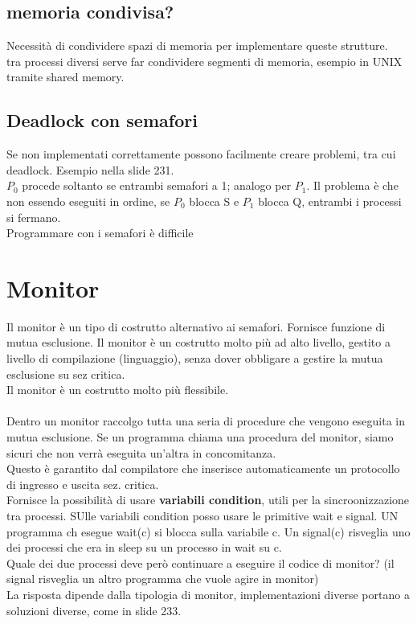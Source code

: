 \documentclass{article}
\begin{document}
\subsection{memoria condivisa?}
Necessità di condividere spazi di memoria per implementare queste strutture. \\
tra processi diversi serve far condividere segmenti di memoria, esempio in UNIX tramite shared memory.

\subsection{Deadlock con semafori}
Se non implementati correttamente possono facilmente creare problemi, tra cui deadlock. Esempio nella slide 231.\\
$P_0$ procede soltanto se entrambi semafori a 1; analogo per $P_1$. Il problema è che non essendo eseguiti in ordine, se $P_0$ blocca S e $P_1$ blocca Q, entrambi i processi si fermano.\\
Programmare con i semafori è difficile

\section{Monitor}
Il monitor è un tipo di costrutto alternativo ai semafori. Fornisce funzione di mutua esclusione. Il monitor è un costrutto molto più ad alto livello, gestito a livello di compilazione (linguaggio), senza dover obbligare a gestire la mutua esclusione su sez critica.\\
Il monitor è un costrutto molto più flessibile.\\
\\
Dentro un monitor raccolgo tutta una seria di procedure che vengono eseguita in mutua esclusione. Se un programma chiama una procedura del monitor, siamo sicuri che non verrà eseguita un'altra in concomitanza.\\
Questo è garantito dal compilatore che inserisce automaticamente un protocollo di ingresso e uscita sez. critica.\\
Fornisce la possibilità di usare \textbf{variabili condition}, utili per la sincroonizzazione tra processi. SUlle variabili condition posso usare le primitive wait e signal. UN programma ch esegue wait(c) si blocca sulla variabile c. Un signal(c) risveglia uno dei processi che era in sleep su un processo in wait su c. \\
Quale dei due processi deve però continuare a eseguire il codice di monitor? (il signal risveglia un altro programma che vuole agire in monitor)\\
La risposta dipende dalla tipologia di monitor, implementazioni diverse portano a soluzioni diverse, come in slide 233.\\
\end{document}
